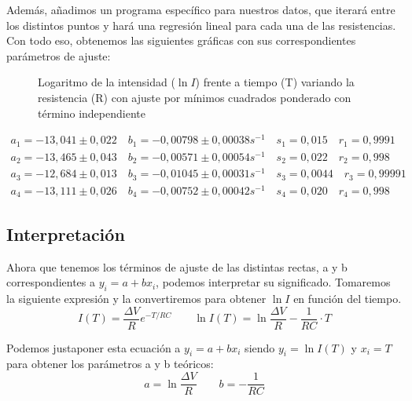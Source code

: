 \documentclass[12pt, a4paper, titlepage]{article}
\begin{document}
  Además, añadimos un programa específico para nuestros datos, que iterará entre los distintos puntos y hará una regresión lineal para cada una de las resistencias. Con todo eso, obtenemos las siguientes gráficas con sus correspondientes parámetros de ajuste:

  \begin{figure}[H]
    \hspace{0.2em} 
    \caption{Logaritmo de la intensidad ($\ln{I}$) frente a tiempo (T) variando la resistencia (R) con ajuste por mínimos cuadrados ponderado con término independiente}
  \end{figure}

  \begin{gather*}
    a_1 = -13,041 \pm 0,022 \quad b_1 = -0,00798 \pm 0,00038 s^{-1} \quad s_1 = 0,015 \quad r_1 = 0,9991 \\
    a_2 = -13,465 \pm 0,043 \quad b_2 = -0,00571 \pm 0,00054 s^{-1} \quad s_2 = 0,022 \quad r_2 = 0,998 \\
    a_3 = -12,684 \pm 0,013 \quad b_3 = -0,01045 \pm 0,00031 s^{-1} \quad s_3 = 0,0044 \quad r_3 = 0,99991 \\
    a_4 = -13,111 \pm 0,026 \quad b_4 = -0,00752 \pm 0,00042 s^{-1} \quad s_4 = 0,020 \quad r_4 = 0,998
  \end{gather*}

  \newpage
  \subsection{Interpretación}

  Ahora que tenemos los términos de ajuste de las distintas rectas, a y b correspondientes a $y_i = a + bx_i$, podemos interpretar su significado. Tomaremos la siguiente expresión y la convertiremos para obtener $\ln{I}$ en función del tiempo.
  \begin{equation}
    I(T) = \frac{\Delta V}{R} e^{-T/RC} \qquad \ln{I(T)} = \ln{\frac{\Delta V}{R}} - \frac{1}{RC} \cdot T \label{ec:I}
  \end{equation}

  Podemos justaponer esta ecuación a $y_i = a + bx_i$ siendo $y_i = \ln{I(T)}$ y $x_i = T$ para obtener los parámetros a y b teóricos:
  \begin{equation}
    a = \ln{\frac{\Delta V}{R}} \qquad b = - \frac{1}{RC} \label{ec:abteo}
  \end{equation}
\end{document}
